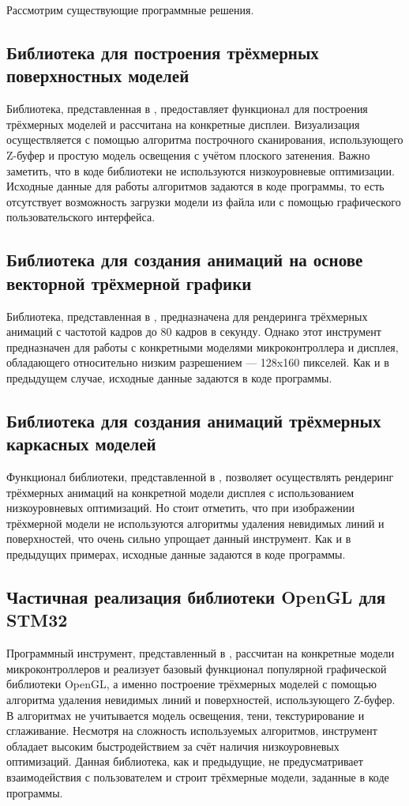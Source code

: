 Рассмотрим существующие программные решения.

\subsection{Библиотека для построения трёхмерных поверхностных моделей}
Библиотека, представленная в \cite{git1}, предоставляет функционал для построения трёхмерных моделей и рассчитана на конкретные дисплеи. 
Визуализация осуществляется с помощью алгоритма построчного сканирования, использующего Z-буфер и простую модель освещения с учётом 
плоского затенения. Важно заметить, что в коде библиотеки не используются низкоуровневые оптимизации. Исходные данные для работы 
алгоритмов задаются в коде программы, то есть отсутствует возможность загрузки модели из файла или с помощью графического 
пользовательского интерфейса.

\subsection{Библиотека для создания анимаций на основе векторной трёхмерной графики}
Библиотека, представленная в \cite{git2}, предназначена для рендеринга трёхмерных анимаций с частотой кадров до 80 кадров в секунду. Однако этот инструмент предназначен 
для работы с конкретными моделями микроконтроллера и дисплея, обладающего относительно низким разрешением — 128x160 пикселей. Как и в 
предыдущем случае, исходные данные задаются в коде программы.

\subsection{Библиотека для создания анимаций трёхмерных каркасных моделей}
Функционал библиотеки, представленной в \cite{git3}, позволяет осуществлять рендеринг трёхмерных анимаций на конкретной модели дисплея с использованием низкоуровневых 
оптимизаций. Но стоит отметить, что при изображении трёхмерной модели не используются алгоритмы удаления невидимых линий и поверхностей, 
что очень сильно упрощает данный инструмент. Как и в предыдущих примерах, исходные данные задаются в коде программы.

\subsection{Частичная реализация библиотеки OpenGL для STM32}
Программный инструмент, представленный в \cite{git4}, рассчитан на конкретные модели микроконтроллеров и реализует базовый функционал популярной графической библиотеки 
OpenGL, а именно построение трёхмерных моделей с помощью алгоритма удаления невидимых линий и поверхностей, использующего Z-буфер. В 
алгоритмах не учитывается модель освещения, тени, текстурирование и сглаживание. Несмотря на сложность используемых алгоритмов, инструмент 
обладает высоким быстродействием за счёт наличия низкоуровневых оптимизаций. Данная библиотека, как и предыдущие, не предусматривает 
взаимодействия с пользователем и строит трёхмерные модели, заданные в коде программы.

